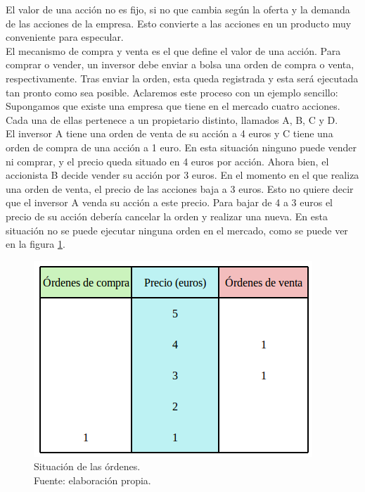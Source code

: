 		El valor de una acci\'on no es fijo, si no que cambia seg\'un la oferta y la demanda de las acciones de la empresa. Esto convierte a las acciones en un producto muy conveniente para especular.\\
		
		El mecanismo de compra y venta es el que define el valor de una acci\'on. Para comprar o vender, un inversor debe enviar a bolsa una orden de compra o venta, respectivamente. Tras enviar la orden, esta queda registrada y esta ser\'a ejecutada tan pronto como sea posible. Aclaremos este proceso con un ejemplo sencillo:\\
		
		Supongamos que existe una empresa que tiene en el mercado cuatro acciones. Cada una de ellas pertenece a un propietario distinto, llamados A, B, C y D. \\
		
		El inversor A tiene una orden de venta de su acci\'on a 4 euros y C tiene una orden de compra de una acci\'on a 1 euro. En esta situaci\'on ninguno puede vender ni comprar, y el precio queda situado en 4 euros por acci\'on. Ahora bien, el accionista B decide vender su acci\'on por 3 euros. En el momento en el que realiza una orden de venta, el precio de las acciones baja a 3 euros. Esto no quiere decir que el inversor A venda su acci\'on a este precio. Para bajar de 4 a 3 euros el precio de su acci\'on deber\'ia cancelar la orden y realizar una nueva. En esta situaci\'on no se puede ejecutar ninguna orden en el mercado, como se puede ver en la figura \ref{fig:ordenes_ejemplo}.\\
		
				\begin{figure}[H]
					\centering
					\includegraphics[scale=2]{imagenes/ordenes_ejemplo.png}
					\caption[Ejemplo de situaci\'on de las \'ordenes]{Situaci\'on de las \'ordenes.\\ Fuente: elaboraci\'on propia.}
					\label{fig:ordenes_ejemplo}
				\end{figure}
		
